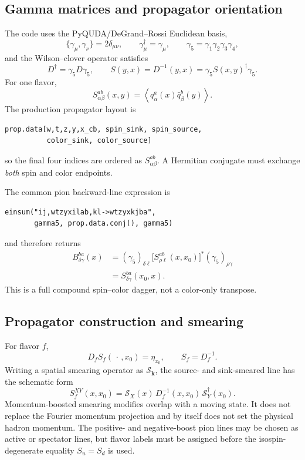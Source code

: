 \documentclass[11pt,a4paper]{article}
\numberwithin{equation}{section}
\newcommand{\avg}[1]{\left\langle #1\right\rangle}
\begin{document}
\subsection{Gamma matrices and propagator orientation}

The code uses the PyQUDA/DeGrand--Rossi Euclidean basis,
\begin{equation}
 \{\gamma_\mu,\gamma_\nu\}=2\delta_{\mu\nu},\qquad
 \gamma_\mu^\dagger=\gamma_\mu,\qquad
 \gamma_5=\gamma_1\gamma_2\gamma_3\gamma_4,
\end{equation}
and the Wilson--clover operator satisfies
\begin{equation}
 D^\dagger=\gamma_5D\gamma_5,\qquad
 S(y,x)=D^{-1}(y,x)=\gamma_5S(x,y)^\dagger\gamma_5.
 \label{eq:g5-hermiticity}
\end{equation}
For one flavor,
\begin{equation}
 S_{\alpha\beta}^{ab}(x,y)
 =\avg{q_\alpha^a(x)\bar q_\beta^b(y)}.
\end{equation}
The production propagator layout is
\begin{lstlisting}
prop.data[w,t,z,y,x_cb, spin_sink, spin_source,
          color_sink, color_source]
\end{lstlisting}
so the final four indices are ordered as
\(S_{\alpha\beta}^{ab}\).  A Hermitian conjugate must exchange \emph{both}
spin and color endpoints.

The common pion backward-line expression is
\begin{lstlisting}
einsum("ij,wtzyxilab,kl->wtzyxkjba",
       gamma5, prop.data.conj(), gamma5)
\end{lstlisting}
and therefore returns
\begin{align}
 B_{\delta\gamma}^{ba}(x)
 &=(\gamma_5)_{\delta\ell}
   \bigl[S_{\rho\ell}^{ab}(x,x_0)\bigr]^*
   (\gamma_5)_{\rho\gamma}
 \nonumber\\
 &=S_{\delta\gamma}^{ba}(x_0,x).
 \label{eq:backward-line-indices}
\end{align}
This is a full compound spin--color dagger, not a color-only transpose.

\subsection{Propagator construction and smearing}

For flavor \(f\),
\begin{equation}
 D_f S_f(\,\cdot\,,x_0)=\eta_{x_0},\qquad
 S_f=D_f^{-1}.
\end{equation}
Writing a spatial smearing operator as \(\mathcal S_{\boldsymbol k}\), the
source- and sink-smeared line has the schematic form
\begin{equation}
 S_f^{XY}(x,x_0)
 =\mathcal S_X(x)\,D_f^{-1}(x,x_0)\,
  \mathcal S_Y^\dagger(x_0).
 \label{eq:smeared-prop}
\end{equation}
Momentum-boosted smearing modifies overlap with a moving state.  It does not
replace the Fourier momentum projection and by itself does not set the
physical hadron momentum.  The positive- and negative-boost pion lines may be
chosen as active or spectator lines, but flavor labels must be assigned before
the isospin-degenerate equality \(S_u=S_d\) is used.
\end{document}
